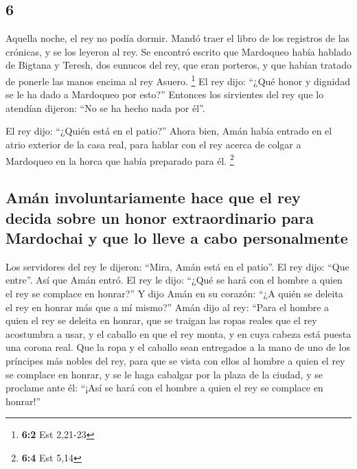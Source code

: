 \begin{paracol}{2}
{\section{6}\label{section-10}}

 Aquella noche, el rey no podía dormir. Mandó traer el
libro de los registros de las crónicas, y se los leyeron al rey.
 Se encontró escrito que Mardoqueo había hablado de
Bigtana y Teresh, dos eunucos del rey, que eran porteros, y que habían
tratado de ponerle las manos encima al rey Asuero. \footnote{\textbf{6:2}
  Est 2,21-23}  El rey dijo: ``¿Qué honor y dignidad se le
ha dado a Mardoqueo por esto?'' Entonces los sirvientes del rey que lo
atendían dijeron: ``No se ha hecho nada por él''.

 El rey dijo: ``¿Quién está en el patio?'' Ahora bien,
Amán había entrado en el atrio exterior de la casa real, para hablar con
el rey acerca de colgar a Mardoqueo en la horca que había preparado para
él. \footnote{\textbf{6:4} Est 5,14}

\hypertarget{amuxe1n-involuntariamente-hace-que-el-rey-decida-sobre-un-honor-extraordinario-para-mardochai-y-que-lo-lleve-a-cabo-personalmente}{%
\subsection{Amán involuntariamente hace que el rey decida sobre un honor
extraordinario para Mardochai y que lo lleve a cabo
personalmente}\label{amuxe1n-involuntariamente-hace-que-el-rey-decida-sobre-un-honor-extraordinario-para-mardochai-y-que-lo-lleve-a-cabo-personalmente}}

 Los servidores del rey le dijeron: ``Mira, Amán está en
el patio''. El rey dijo: ``Que entre''.  Así que Amán
entró. El rey le dijo: ``¿Qué se hará con el hombre a quien el rey se
complace en honrar?'' Y dijo Amán en su corazón: ``¿A quién se deleita
el rey en honrar más que a mí mismo?''  Amán dijo al rey:
``Para el hombre a quien el rey se deleita en honrar,  que
se traigan las ropas reales que el rey acostumbra a usar, y el caballo
en que el rey monta, y en cuya cabeza está puesta una corona real.
 Que la ropa y el caballo sean entregados a la mano de uno
de los príncipes más nobles del rey, para que se vista con ellos al
hombre a quien el rey se complace en honrar, y se le haga cabalgar por
la plaza de la ciudad, y se proclame ante él: ``¡Así se hará con el
hombre a quien el rey se complace en honrar!''


\end{paracol}
